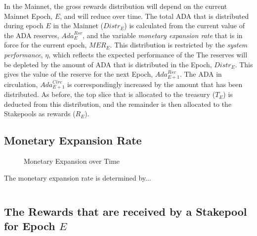 \documentclass[11pt,a4paper,dvipsnames,twosided,final]{article}
\newcommand{\ada}{ADA{}}
\begin{document}
\noindent
In the Mainnet, the gross rewards distribution will depend on the current Mainnet Epoch, $E$, and will reduce over time.
The total \ada{} that is distributed during epoch $E$ in the Mainnet (${\textit{Distr}}_E$) is calculated from the current
value of the \ada{} reserves, $\textit{Ada}^{\textit{Rsv}}_E$, and the variable \emph{monetary expansion rate} that is in force for
the current epoch, $\textit{MER}_E$.
%
This distribution is restricted by the \emph{system performance}, $\eta$, which reflects the expected performance of the
%
The reserves will be depleted by the amount of \ada{} that is distributed in the Epoch, $\textit{Distr}_E$. This gives the
value of the reserve for the next Epoch, $\textit{Ada}^{\textit{Rsv}}_{E+1}$.  The \ada{} in circulation, $\textit{Ada}^{\textit{Circ}}_{E+1}$
is correspondingly increased by the amount that has been distributed.
As before, the top slice that is allocated to the treasury ($T_E$) is
deducted from this distribution, and the remainder is then allocated to the Stakepools as rewards ($R_E$).

\subsection{Monetary Expansion Rate}
\label{sec:expansion}

\begin{figure}[h!]
  \begin{center}
  \end{center}
  \caption{Monetary Expansion over Time}
\end{figure}

The monetary expansion rate is determined by...

\begin{equation}
\end{equation}


\clearpage
\subsection{The Rewards that are received by a Stakepool for Epoch $E$}
\end{document}
